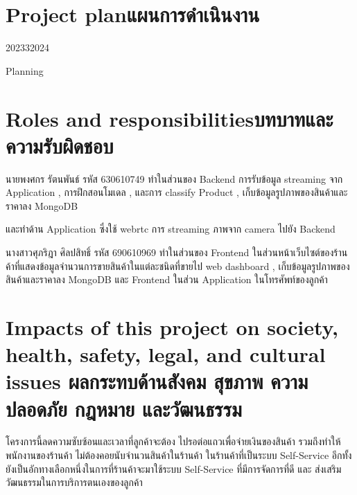 
\section{\ifenglish Project plan\else แผนการดำเนินงาน\fi}
\begin{table}[h]
    \begin{plan}{1}{2023}{3}{2024}
    \end{plan}
    
    \caption[Planning]{Planning}
    \label{table:Planning}
    \end{table}
 

\section{\ifenglish Roles and responsibilities\else บทบาทและความรับผิดชอบ\fi}
นายพงศกร รัตนพันธ์ รหัส 630610749 ทำในส่วนของ Backend การรับข้อมูล streaming จาก Application   , การฝึกสอนโมเดล , และการ classify Product  , เก็บข้อมูลรูปภาพของสินค้าและราคาลง MongoDB 

 และทำด้าน Application  ซึ่งใช้ webrtc  การ streaming ภาพจาก camera  ไปยัง Backend

นางสาวศุภริฎา  ศิลปสิทธิ์    รหัส  690610969 ทำในส่วนของ  Frontend ในส่วนหน้าเว็บไซต์ของร้านค้าที่แสดงข้อมูลจำนวนการขายสินค้าในแต่ละชนิดที่ขายไป web dashboard , เก็บข้อมูลรูปภาพของสินค้าและราคาลง MongoDB 
และ Frontend  ในส่วน Application ในโทรศัพท์ของลูกค้า 
\section{\ifenglish%
Impacts of this project on society, health, safety, legal, and cultural issues
\else%
ผลกระทบด้านสังคม สุขภาพ ความปลอดภัย กฎหมาย และวัฒนธรรม
\fi}

โครงการนี้ลดความซับซ้อนและเวลาที่ลูกค้าจะต้อง ไปรอต่อแถวเพื่อจ่ายเงินของสินค้า
รวมถึงทำให้พนักงานของร้านค้า ไม่ต้องคอยนับจำนวนสินค้าในร้านค้า  ในร้านค้าที่เป็นระบบ Self-Service  อีกทั้งยังเป็นอักทางเลือกหนึ่งในการที่ร้านค้าจะมาใช้ระบบ Self-Service ที่มีการจัดการที่ดี และ ส่งเสริมวัฒนธรรมในการบริการตนเองของลูกค้า
